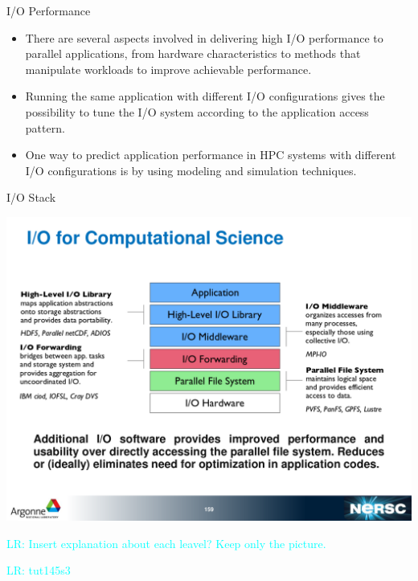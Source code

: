 \documentclass[compress,11pt,xcolor=svgnames,aspectratio=169]{beamer}
\newcommand{\lr}[1]{\textcolor{cyan}{LR: #1}}
\begin{document}
\begin{frame}[t]{I/O Performance}

\begin{itemize}
\setlength\itemsep{0.8cm}

  \item There are several aspects involved in delivering high I/O performance to parallel applications, from hardware characteristics to methods that manipulate workloads to improve achievable performance.

  \item Running the same application with different I/O configurations gives the possibility to tune the I/O system according to the application access pattern.

  \item One way to predict application performance in HPC systems with different I/O configurations is by using modeling and simulation techniques.

\end{itemize}

\nocite{SOPPOAASLK13}

\end{frame}

\begin{frame}[t]{I/O Stack}

\begin{center}
\includegraphics[scale=0.4]{fig/io-stack2}
\end{center}

\lr{Insert explanation about each leavel? Keep only the picture.}

\lr{tut145s3}

\end{frame}
\end{document}
